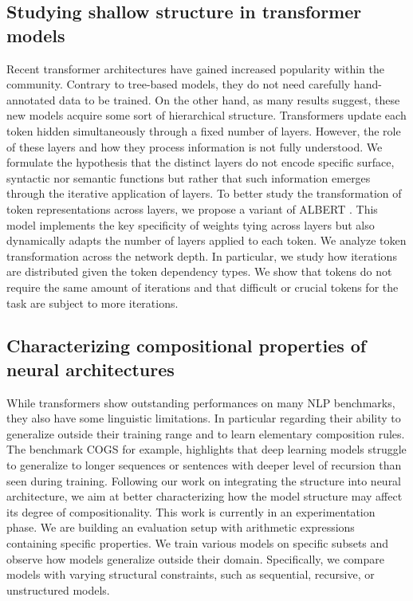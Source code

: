 \subsection{Studying shallow structure in transformer models}

Recent transformer architectures have gained increased popularity within the community. Contrary to tree-based models, they do not need carefully hand-annotated data to be trained. On the other hand, as many results suggest, these new models acquire some sort of hierarchical structure. Transformers update each token hidden simultaneously through a fixed number of layers. However, the role of these layers and how they process information is not fully understood. We formulate the hypothesis that the distinct layers do not encode specific surface, syntactic nor semantic functions but rather that such information emerges through the iterative application of layers. To better study the transformation of token representations across layers, we propose a variant of ALBERT \parencite{simoulin_2021b}. This model implements the key specificity of weights tying across layers but also dynamically adapts the number of layers applied to each token. We analyze token transformation across the network depth. In particular, we study how iterations are distributed given the token dependency types. We show that tokens do not require the same amount of iterations and that difficult or crucial tokens for the task are subject to more iterations.

\subsection{Characterizing compositional properties of neural architectures}

While transformers show outstanding performances on many NLP benchmarks, they also have some linguistic limitations. In particular regarding their ability to generalize outside their training range and to learn elementary composition rules. The benchmark COGS \parencite{kim_20} for example, highlights that deep learning models struggle to generalize to longer sequences or sentences with deeper level of recursion than seen during training. Following our work on integrating the structure into neural architecture, we aim at better characterizing how the model structure may affect its degree of compositionality. This work is currently in an experimentation phase. We are building an evaluation setup with arithmetic expressions containing specific properties. We train various models on specific subsets and observe how models generalize outside their domain. Specifically, we compare models with varying structural constraints, such as sequential, recursive, or unstructured models.

